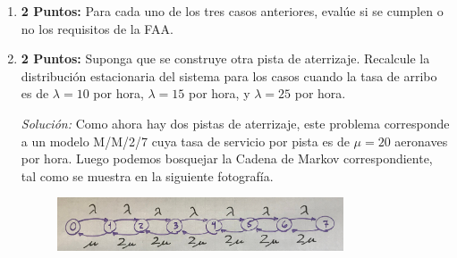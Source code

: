 \documentclass[ a4paper, twoside, 11pt]{article}
\begin{document}
\begin{problem}
\begin{enumerate}[label=\textbf{\alph*)}]
\item \textbf{2 Puntos:} Para cada uno de los tres casos anteriores, eval\'ue si se cumplen o no los requisitos de la FAA. 

\item \textbf{2 Puntos:} Suponga que se construye otra pista de aterrizaje. Recalcule la distribuci\'on estacionaria del sistema para los casos cuando la tasa de arribo es de $\lambda = 10$ por hora, $\lambda = 15$ por hora, y $\lambda = 25$ por hora. 

\emph{Soluci\'on:} Como ahora hay dos pistas de aterrizaje, este problema corresponde a un modelo M/M/2/7 cuya tasa de servicio por pista es de $\mu = 20$ aeronaves por hora. Luego podemos bosquejar la Cadena de Markov correspondiente, tal como se muestra en la siguiente fotograf\'ia. 

\begin{figure}[htb]
\centering
\includegraphics[width=0.8\textwidth]{problema-1-B.jpg}
\end{figure}


\end{enumerate}
\end{problem}
\end{document}
